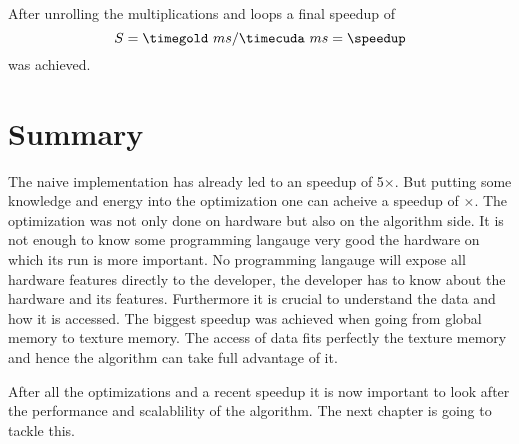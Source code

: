 After unrolling the multiplications and loops a final speedup of 
\fpDiv{\speedup}{\timegold}{\timecuda}
\begin{equation*}\label{eq:speedup11}
	S = \timegold\ ms/\timecuda\ ms = \speedup
\end{equation*}
was achieved.

\section{Summary} %
\label{sec:summary}
The naive implementation has already led to an speedup of 5$\times$. But putting
some knowledge and energy into the optimization one can acheive a speedup of 
\speedup$\times$. The optimization was not only done on hardware but also on the 
algorithm side. It is not enough to know some programming langauge very good the
hardware on which its run is more important. No programming langauge will expose
all hardware features directly to the developer, the developer has to know
about the hardware and its features. Furthermore it is crucial to understand
the data and how it is accessed. The biggest speedup was achieved when
going from global memory to texture memory. The access of data fits perfectly
the texture memory and hence the algorithm can take full advantage of it. 

After all the optimizations and a recent speedup it is now important to look 
after the performance and scalablility of the algorithm. The next chapter is 
going to tackle this. 




